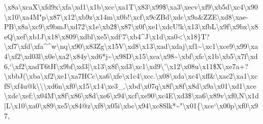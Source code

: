 \documentclass[11pt]{article}
\begin{document}
\textbackslash{}x8a\textbackslash{}xcaX\textbackslash{}xfd9x\textbackslash{}xfa\textbackslash{}xd1\textbackslash{}x1b\textbackslash{}xcc\textbackslash{}xa1T\textbackslash{}x83\textbackslash{}x99\$\textbackslash{}xa3\textbackslash{}xecv\textbackslash{}xf9\textbackslash{}xb5d\textbackslash{}xc4\textbackslash{}x90\textbackslash{}x10\textbackslash{}xa4M"p\textbackslash{}x87\textbackslash{}x12\textbackslash{}xb9z\textbackslash{}x14m\textbackslash{}x0b!\textbackslash{}xcf\textbackslash{}x9cZBd\textbackslash{}xdc\textbackslash{}x9a\&ZZE\textbackslash{}xd8\textbackslash{}xae-PB\textbackslash{}x8a\textbackslash{}xc9\textbackslash{}x9bmJ\textbackslash{}xd72\textbackslash{}x1e\textbackslash{}xb2\$\textbackslash{}x87\textbackslash{}x0f\textbackslash{}xe1\textbackslash{}xdcU!k\textbackslash{}x13\textbackslash{}xfbL\textbackslash{}x9f\textbackslash{}x9bx\textbackslash{}x8eQ\textbackslash{}xef\textbackslash{}xb1J\textbackslash{}x18\textbackslash{}x809\textbackslash{}xdbl\textbackslash{}xe5\textbackslash{}xdf`7\textbackslash{}xb4\^{}J\textbackslash{}x1d\textbackslash{}xa0<\textbackslash{}x18\}T?\textbackslash{}xf7\textbackslash{}xfd\textbackslash{}xfa\^{}\^{}w\textbackslash{}nq\textbackslash{}x90\textbackslash{}x83Zg\textbackslash{}x15V\textbackslash{}xd8\textbackslash{}x13\textbackslash{}xad\textbackslash{}xdaj\textbackslash{}xf1\textasciitilde{}\textbackslash{}xc1\textbackslash{}xce9\textbackslash{}x99\textbackslash{}xa4\textbackslash{}xf2\textbackslash{}xd03l\textbackslash{}x0e\textbackslash{}xa2\textbackslash{}x84y\textbackslash{}xd6*j\textasciitilde{}\textbackslash{}x98D\textbackslash{}x15\textbackslash{}xca\textbackslash{}x98\textasciitilde{}\textbackslash{}xbf\textbackslash{}xfc\textbackslash{}x1b\textbackslash{}xb5\textbackslash{}x7f\textbackslash{}xd6,`\textbackslash{}xf2\textbackslash{}xadT6tH\textbackslash{}x9bf\textbackslash{}xd3|\textbackslash{}x13\textbackslash{}x8f\textbackslash{}xd3\textbackslash{}xc1\textbackslash{}xd9\textbackslash{}'\textbackslash{}x12\textbackslash{}x08u\textbackslash{}x11\$X\textbackslash{}xe7a+?\textbackslash{}xbbJ(\textbackslash{}xba\textbackslash{}xf2\textbackslash{}xe1\textbackslash{}xa7HCc\textbackslash{}xa6\textbackslash{}xfe\textbackslash{}x1c4\textbackslash{}xcc.\textbackslash{}x08\textbackslash{}xda\textbackslash{}xc4\textbackslash{}xff\&\textbackslash{}xac2\textbackslash{}xa1\textbackslash{}xcfS\textbackslash{}xf4u@k\textbackslash{}\textbackslash{}\textbackslash{}xd6n\textbackslash{}xf0\textbackslash{}x15\textbackslash{}x14\textbackslash{}xe3\_,\textbackslash{}xbd\textbackslash{}x07q\textbackslash{}x8f\textbackslash{}x8f\textbackslash{}x8d\textbackslash{}x9a\textbackslash{}x01\textbackslash{}xd1\textbackslash{}xce\textbackslash{}xdc\textbackslash{}xef;\textbackslash{}x04M\textbackslash{}x8f\textbackslash{}x86\textbackslash{}x8d\textbackslash{}xe6\textbackslash{}x94\textbackslash{}xcf\textbackslash{}xe90\textbackslash{}xc4E\textbackslash{}xd3\$\textbackslash{}xa6\textbackslash{}x89v\textbackslash{}xf0,N\textbackslash{}x1d|L\textbackslash{}x10\textbackslash{}xa0\textbackslash{}x89\textbackslash{}xe5\textbackslash{}x84@z\textbackslash{}xf8\textbackslash{}x05i\textbackslash{}xbc\textbackslash{}x94\textbackslash{}xc8Slk*\textasciitilde{}"\textbackslash{}x01\{\textbackslash{}xce`\textbackslash{}x00p\textbackslash{}xf0\textbackslash{}x97,\textbackslas
\end{document}
